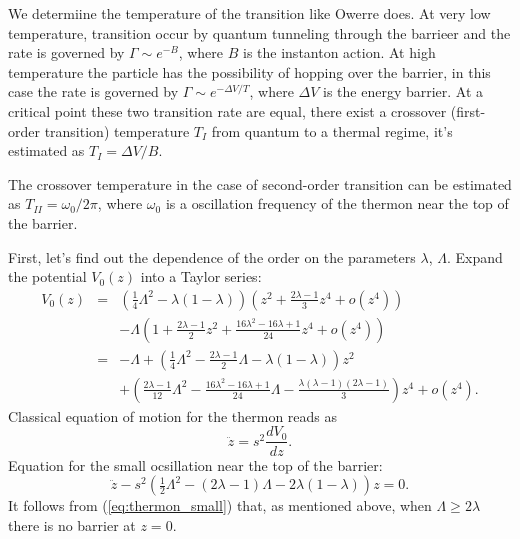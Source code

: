 \documentclass[aps, pre, preprint, groupedaddress, superscriptaddress, showkeys, showpacs] {revtex4-1}
\begin{document}
We determiine the temperature of the transition like Owerre does.
At very low temperature, transition occur by quantum tunneling through the barrieer and the rate is governed by $\Gamma \sim e^{-B}$, where $B$ is the instanton action.
At high temperature the particle has the possibility of hopping over the barrier, in this case the rate is governed by $\Gamma \sim e^{-\Delta V / T}$, where $\Delta V$ is the energy barrier.
At a critical point these two transition rate are equal, there exist a crossover (first-order transition) temperature $T_{I}$ from quantum to a thermal regime, it's estimated as $T_{I} = \Delta V / B$.

The crossover temperature in the case of second-order transition can be estimated as $T_{II} = \omega_0 / 2 \pi$, where $\omega_0$ is a oscillation frequency of the thermon near the top of the barrier.

First, let's find out the dependence of the order on the parameters $\lambda$, $\Lambda$.
Expand the potential $V_0(z)$ into a Taylor series:
%
\begin{equation}
\begin{array}{lcl}
V_0(z) & = & \left( \frac{1}{4}\Lambda^2 - \lambda (1 - \lambda) \right) \left( z^2 + \frac{2\lambda - 1}{3} z^4 + o(z^4) \right) \\ && - \Lambda \left( 1 + \frac{2\lambda - 1}{2} z^2 + \frac{16\lambda^2 - 16\lambda + 1}{24} z^4 + o(z^4) \right) \\
& = & -\Lambda + \left( \frac{1}{4} \Lambda^2  - \frac{2\lambda - 1}{2} \Lambda - \lambda (1 - \lambda) \right) z^2 \\
&& + \left( \frac{2\lambda - 1}{12} \Lambda^2 - \frac{16\lambda^2 - 16\lambda + 1}{24} \Lambda - \frac{\lambda (\lambda - 1) (2\lambda - 1)}{3} \right) z^4 + o(z^4).
\end{array}
\label{eq:potential_teylor}
\end{equation}
%
Classical equation of motion for the thermon reads as
%
\begin{equation}
\ddot{z} = s^2 \frac{d V_0}{dz}.
\label{eq:thermon}
\end{equation}
%
Equation for the small ocsillation near the top of the barrier:
%
\begin{equation}
\ddot{z} - s^2 \left( \tfrac{1}{2} \Lambda^2 - (2\lambda - 1) \Lambda - 2 \lambda (1 - \lambda) \right) z = 0.
\label{eq:thermon_small}
\end{equation}
%
It follows from (\ref{eq:thermon_small}) that, as mentioned above, when $\Lambda \ge 2\lambda$ there is no barrier at $z = 0$.
\end{document}
